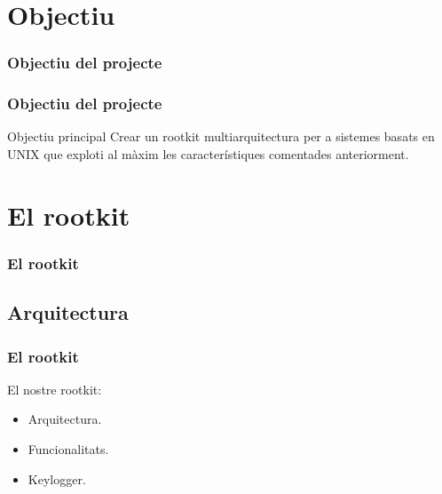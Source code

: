 \documentclass{beamer}
\begin{document}
\section{Objectiu}
\begin{frame}
	\frametitle{Objectiu del projecte}
\end{frame}

\begin{frame}
	\frametitle{Objectiu del projecte}
	\begin{block}{Objectiu principal}
	Crear un rootkit multiarquitectura per a sistemes basats en UNIX que exploti al màxim 
	les característiques comentades anteriorment.
	\end{block}
\end{frame}


\section{El rootkit}
\begin{frame}
    \frametitle{El rootkit}
\end{frame}

\subsection{Arquitectura}

\begin{frame}
    \frametitle{El rootkit}
	\begin{block}{El nostre rootkit:}
		\begin{itemize}
			\item \alert{Arquitectura.}
			\item Funcionalitats.
			\item Keylogger.
		\end{itemize}
	\end{block}
\end{frame}
\end{document}
